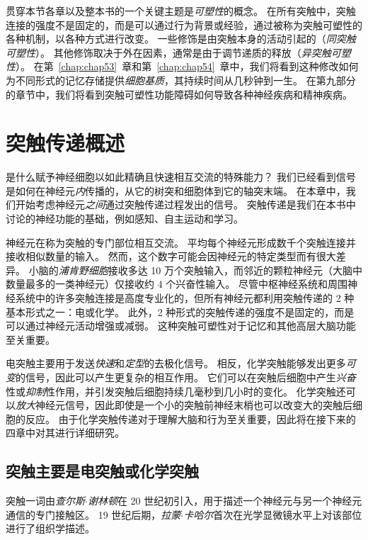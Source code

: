贯穿本节各章以及整本书的一个关键主题是\textit{可塑性}的概念。
在所有突触中，突触连接的强度不是固定的，而是可以通过行为背景或经验，通过被称为突触可塑性的各种机制，以各种方式进行改变。
一些修饰是由突触本身的活动引起的（\textit{同突触可塑性}）。
其他修饰取决于外在因素，通常是由于调节递质的释放（\textit{异突触可塑性}）。
在第~\ref{chap:chap53}~章和第~\ref{chap:chap54}~章中，我们将看到这种修改如何为不同形式的记忆存储提供\textit{细胞基质}，其持续时间从几秒钟到一生。
在第九部分的章节中，我们将看到突触可塑性功能障碍如何导致各种神经疾病和精神疾病。



\chapter{突触传递概述} \label{chap:chap11}

是什么赋予神经细胞以如此精确且快速相互交流的特殊能力？
我们已经看到信号是如何在神经元\textit{内}传播的，从它的树突和细胞体到它的轴突末端。
在本章中，我们开始考虑神经元\textit{之间}通过突触传递过程发出的信号。
突触传递是我们在本书中讨论的神经功能的基础，例如感知、自主运动和学习。


神经元在称为突触的专门部位相互交流。
平均每个神经元形成数千个突触连接并接收相似数量的输入。
然而，这个数字可能会因神经元的特定类型而有很大差异。
小脑的\textit{浦肯野细胞}接收多达 10 万个突触输入，而邻近的颗粒神经元（大脑中数量最多的一类神经元）仅接收约 4 个兴奋性输入。
尽管中枢神经系统和周围神经系统中的许多突触连接是高度专业化的，但所有神经元都利用突触传递的 2 种基本形式之一：电或化学。
此外，2 种形式的突触传递的强度不是固定的，而是可以通过神经元活动增强或减弱。
这种突触可塑性对于记忆和其他高层大脑功能至关重要。


电突触主要用于发送\textit{快速}和\textit{定型}的去极化信号。
相反，化学突触能够发出更多\textit{可变}的信号，因此可以产生更复杂的相互作用。
它们可以在突触后细胞中产生\textit{兴奋}性或\textit{抑制}性作用，并引发突触后细胞持续几毫秒到几小时的变化。
化学突触还可以\textit{放大}神经元信号，因此即使是一个小的突触前神经末梢也可以改变大的突触后细胞的反应。
由于化学突触传递对于理解大脑和行为至关重要，因此将在接下来的四章中对其进行详细研究。



\section{突触主要是电突触或化学突触}

突触一词由\textit{查尔斯$\cdot$谢林顿}在 20 世纪初引入，用于描述一个神经元与另一个神经元通信的专门接触区。
19 世纪后期，\textit{拉蒙$\cdot$卡哈尔}首次在光学显微镜水平上对该部位进行了组织学描述。


